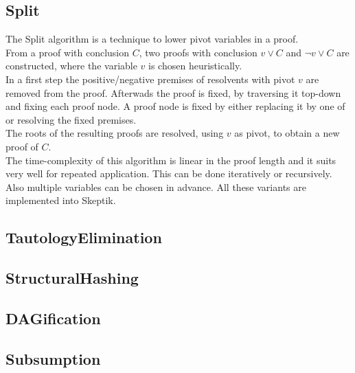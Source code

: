 \documentclass{llncs}
\begin{document}
\subsection{Split}

The Split \cite{CottonSplit} algorithm is a technique to lower pivot variables in a proof.\\
From a proof with conclusion $C$, two proofs with conclusion $v \vee C$ and $\neg{v} \vee C$ are constructed,  where the variable $v$ is chosen heuristically.\\
In a first step the positive/negative premises of resolvents with pivot $v$ are removed from the proof.
Afterwads the proof is fixed, by traversing it top-down and fixing each proof node.
A proof node is fixed by either replacing it by one of or resolving the fixed premises.\\ %
The roots of the resulting proofs are resolved, using $v$ as pivot, to obtain a new proof of $C$.\\
The time-complexity of this algorithm is linear in the proof length %
and it suits very well for repeated application. This can be done iteratively or recursively. Also multiple variables can be chosen in advance. 
All these variants are implemented into Skeptik.

\subsection{TautologyElimination}

\subsection{StructuralHashing}

\subsection{DAGification}

\subsection{Subsumption}
\end{document}
